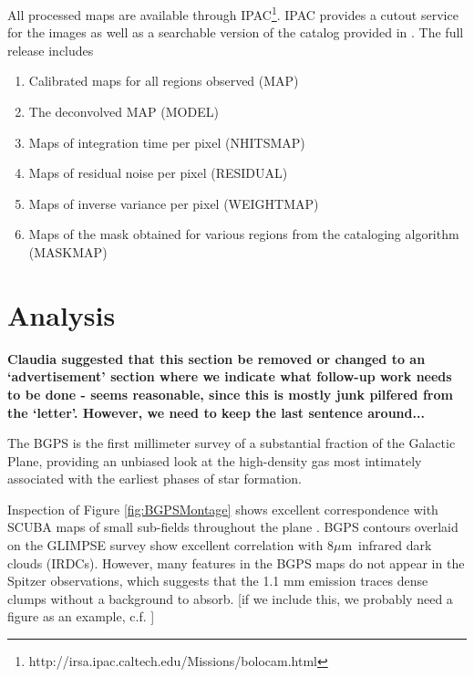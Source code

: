 \documentclass[12pt,preprint]{aastex}
\newcommand{\mum}{\ensuremath{\mu \mathrm{m}}}
\begin{document}
All processed maps are available through
IPAC\footnote{http://irsa.ipac.caltech.edu/Missions/bolocam.html}.
IPAC provides a cutout service for the images as well as a searchable
version of the catalog provided in \citet{rosolowsky09}.  The full
release includes
\begin{enumerate}
\item Calibrated maps for all regions observed (MAP)
\item The deconvolved MAP (MODEL)
\item Maps of integration time per pixel (NHITSMAP)
\item Maps of residual noise per pixel (RESIDUAL)
\item Maps of inverse variance per pixel (WEIGHTMAP)
\item Maps of the mask obtained for various regions from the cataloging algorithm (MASKMAP) \citep{rosolowsky09}
\end{enumerate}


\section{Analysis}
\label{sec:Analysis}

\bf{Claudia suggested that this section be removed or changed to an `advertisement' section
where we indicate what follow-up work needs to be done - seems reasonable, since this
is mostly junk pilfered from the `letter'.  However, we need to keep the last sentence around...}

The BGPS is the first millimeter survey of a substantial fraction
of the Galactic Plane, providing an unbiased look at the high-density
gas most intimately associated with the earliest phases of star
formation.  

Inspection of Figure \ref{fig:BGPSMontage} shows excellent
correspondence with SCUBA maps of small sub-fields throughout the
plane \citep{difrancesco08}.  BGPS contours overlaid on the GLIMPSE
survey \citep{benjamin03} show excellent correlation with 8\mum\
infrared dark clouds (IRDCs).  However, many features in the BGPS maps
do not appear in the Spitzer observations, which suggests that the 1.1
mm emission traces dense clumps without a background to absorb.  [if we
include this, we probably need a figure as an example, c.f. \citet{shuller09}]
\end{document}
